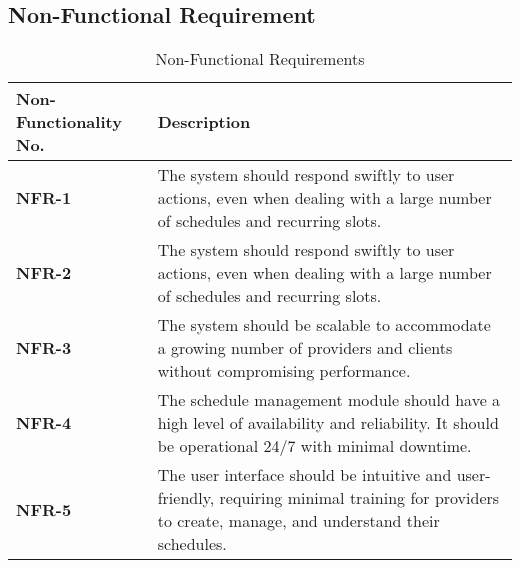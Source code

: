 \documentclass[12pt,a4paper]{article}
\begin{document}
\subsection{Non-Functional Requirement}
\begin{table}[h!]
\caption{Non-Functional Requirements}
    \centering
    \begin{tabular}{|l|p{7cm}|}
    \hline
       \textbf{Non-Functionality No.}&\textbf{Description} \\ %
       \hline
       \textbf{NFR-1}&The system should respond swiftly to user actions, even when dealing with a large number of schedules and recurring slots. \\ %
       \hline
       \textbf{NFR-2}&The system should respond swiftly to user actions, even when dealing with a large number of schedules and recurring slots.\\ %
       \hline
       \textbf{NFR-3}&The system should be scalable to accommodate a growing number of providers and clients without compromising performance.\\ %
       \hline
       \textbf{NFR-4}&The schedule management module should have a high level of availability and reliability. It should be operational 24/7 with minimal downtime.
        \\ %
       \hline
       \textbf{NFR-5}&The user interface should be intuitive and user-friendly, requiring minimal training for providers to create, manage, and understand their schedules.
       \\ %
       \hline
    \end{tabular}
\end{table}
\end{document}
